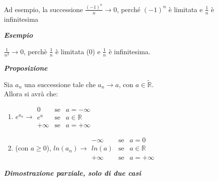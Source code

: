 \documentclass{article}
\theoremstyle{definition}
\begin{document}
    Ad esempio, la successione $\frac{(-1)^n}{n}\to0$, perché $(-1)^n$ è limitata e $\frac{1}{n}$ è infinitesima
\begin{center}
\textbf{\textit{Esempio}}
\end{center}

    $\frac{1}{n^2} \to 0$, perchè $\frac{1}{n}$ è limitata (0) e $\frac{1}{n}$ è infinitesima.
\begin{center}
\textbf{\textit{Proposizione}}
\end{center}

    Sia $a_n$ una successione tale che $a_n \to a$, con $a \in \widetilde{\mathbb{R}}$.
    \\
    Allora si avrà che:
    \begin{enumerate}
        \item $e^{a_n} \to \begin{array}{ccc}
         0    & \mbox{se} & a=-\infty \\
          e^a   & \mbox{se} & a \in \mathbb{R} \\
            +\infty & \mbox{se} & a=+\infty
        \end{array}$
        \item (con $a \geqslant 0$), $ln(a_n) \to \begin{array}{ccc}
            -\infty & \mbox{se}& a=0 \\
            ln(a) & \mbox{se}& a \in \mathbb{R}\\
            +\infty & \mbox{se}& a=+\infty
        \end{array}$
    \end{enumerate}
\begin{center}
\textbf{\textit{Dimostrazione parziale, solo di due casi}}
\end{center}
\end{document}
